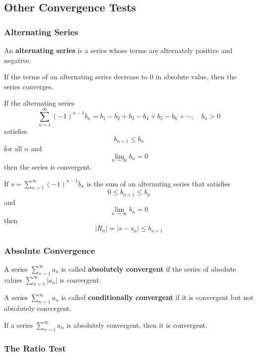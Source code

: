 \subsection{Other Convergence Tests}

\subsubsection*{Alternating Series}

An \textbf{alternating series} is a series whose terms are alternately
positive and negative.

If the terms of an alternating series decrease to 0 in absolute value, then
the series converges.
\begin{theorem}
    If the alternating series
    \[\sum_{n=1}^\infty (-1)^{n-1}b_n=b_1-b_2+b_3-b_4+b_5-b_6+\cdots,
    \quad b_n>0\]
    satisfies
    \[b_{n+1}\leq b_n\]
    for all \(n\) and
    \[\lim_{n\to\infty}b_n=0\]
    then the series is convergent.
\end{theorem}
\begin{theorem}
    If \(\displaystyle{s=\sum_{n=1}^\infty}(-1)^{n-1}b_n\) is the sum of an
    alternating series that satisfies
    \[0\leq b_{n+1}\leq b_n\]
    and
    \[\lim_{n\to\infty}b_n=0\]
    then
    \[|R_n|=|s-s_n|\leq b_{n+1}\]
\end{theorem}

\subsubsection*{Absolute Convergence}

\begin{definition}
    A series \(\displaystyle{\sum_{n=1}^\infty}a_n\) is called
    \textbf{absolutely convergent} if the series of absolute values
    \(\displaystyle{\sum_{n=1}^\infty}|a_n|\) is convergent.
\end{definition}
\begin{definition}
    A series \(\displaystyle{\sum_{n=1}^\infty}a_n\) is called
    \textbf{conditionally convergent} if it is convergent but not absolutely
    convergent.
\end{definition}
\begin{theorem}
    If a series \(\displaystyle{\sum_{n=1}^\infty}a_n\) is absolutely
    convergent, then it is convergent.
\end{theorem}

\subsubsection*{The Ratio Test}

